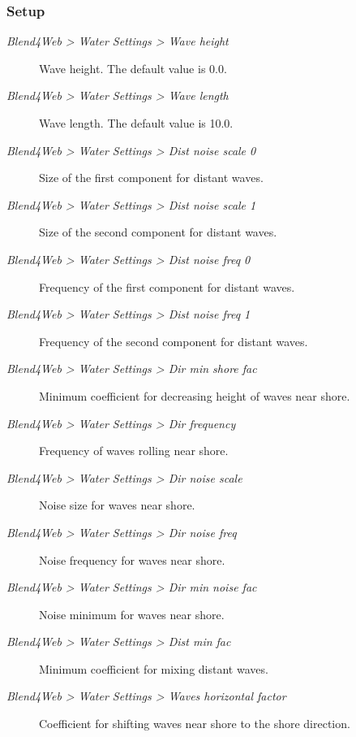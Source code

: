 \documentclass[a4paper,12pt,oneside]{sphinxmanual}
\begin{document}
\subsubsection{Setup}
\label{outdoor_rendering:id22}\begin{description}
\item[{\emph{Blend4Web \textgreater{} Water Settings \textgreater{} Wave height}}] \leavevmode
Wave height. The default value is 0.0.

\item[{\emph{Blend4Web \textgreater{} Water Settings \textgreater{} Wave length}}] \leavevmode
Wave length. The default value is 10.0.

\item[{\emph{Blend4Web \textgreater{} Water Settings \textgreater{} Dist noise scale 0}}] \leavevmode
Size of the first component for distant waves.

\item[{\emph{Blend4Web \textgreater{} Water Settings \textgreater{} Dist noise scale 1}}] \leavevmode
Size of the second component for distant waves.

\item[{\emph{Blend4Web \textgreater{} Water Settings \textgreater{} Dist noise freq 0}}] \leavevmode
Frequency of the first component for distant waves.

\item[{\emph{Blend4Web \textgreater{} Water Settings \textgreater{} Dist noise freq 1}}] \leavevmode
Frequency of the second component for distant waves.

\item[{\emph{Blend4Web \textgreater{} Water Settings \textgreater{} Dir min shore fac}}] \leavevmode
Minimum coefficient for decreasing height of waves near shore.

\item[{\emph{Blend4Web \textgreater{} Water Settings \textgreater{} Dir frequency}}] \leavevmode
Frequency of waves rolling near shore.

\item[{\emph{Blend4Web \textgreater{} Water Settings \textgreater{} Dir noise scale}}] \leavevmode
Noise size for waves near shore.

\item[{\emph{Blend4Web \textgreater{} Water Settings \textgreater{} Dir noise freq}}] \leavevmode
Noise frequency for waves near shore.

\item[{\emph{Blend4Web \textgreater{} Water Settings \textgreater{} Dir min noise fac}}] \leavevmode
Noise minimum for waves near shore.

\item[{\emph{Blend4Web \textgreater{} Water Settings \textgreater{} Dist min fac}}] \leavevmode
Minimum coefficient for mixing distant waves.

\item[{\emph{Blend4Web \textgreater{} Water Settings \textgreater{} Waves horizontal factor}}] \leavevmode
Coefficient for shifting waves near shore to the shore direction.

\end{description}
\end{document}
